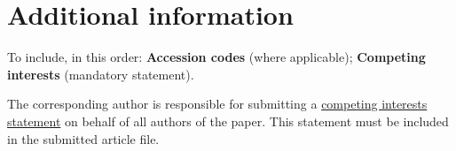\documentclass[fleqn,10pt]{wlscirep}
\begin{document}
\section*{Additional information}

To include, in this order: \textbf{Accession codes} (where applicable);
\textbf{Competing interests} (mandatory statement).

The corresponding author is responsible for submitting a
\href{http://www.nature.com/srep/policies/index.html#competing}{competing
interests statement} on behalf of all authors of the paper. This statement must
be included in the submitted article file.




\end{document}
